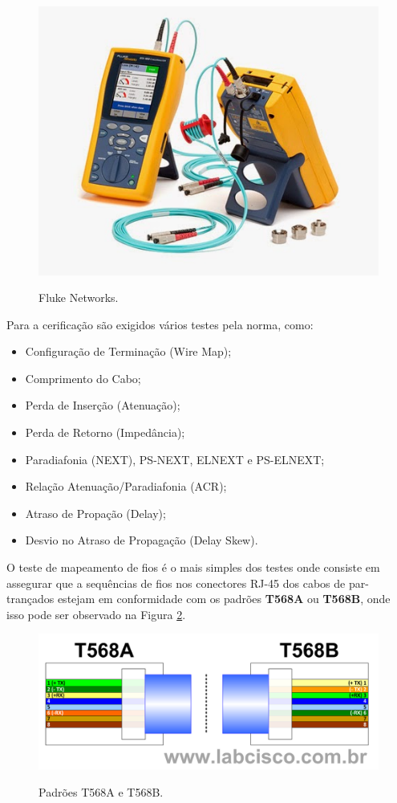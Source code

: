 \documentclass[	DIV=calc,%
							paper=a4,%
							fontsize=12pt,%
							onecolumn]{scrartcl}	 					%
\begin{document}
\begin{figure}[!htbp]
	\centering
	\includegraphics[width=\textwidth]{./imagens/fluke.png}
	\caption{Fluke Networks.}
	\label{fig:fluke_networks}
	\cite{Samuel}
\end{figure} 

Para a cerificação são exigidos vários testes pela norma, como: 
\begin{itemize}
\item Configuração de Terminação (Wire Map);
\item Comprimento do Cabo;
\item Perda de Inserção (Atenuação);
\item Perda de Retorno (Impedância);
\item Paradiafonia (NEXT), PS-NEXT, ELNEXT e PS-ELNEXT;
\item Relação Atenuação/Paradiafonia (ACR);
\item Atraso de Propação (Delay);
\item Desvio no Atraso de Propagação (Delay Skew).
\end{itemize}

O teste de mapeamento de fios é o mais simples dos testes onde consiste em assegurar que a sequências de fios nos conectores RJ-45 dos cabos de par-trançados estejam em conformidade com os padrões \textbf{T568A} ou \textbf{T568B}, onde isso pode ser observado na Figura \ref{fig:mapeamento_de_fios}.

\begin{figure}[!htbp]
	\centering
	\includegraphics[width=\textwidth]{./imagens/mapeamento_de_fios.png}
	\caption{Padrões T568A e T568B.}
	\label{fig:mapeamento_de_fios}
	\cite{Samuel}
\end{figure} 
\end{document}
